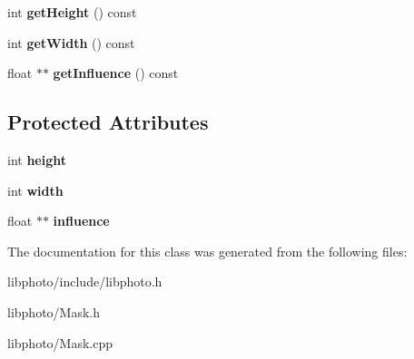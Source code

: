 \begin{DoxyCompactItemize}
\item 
\hypertarget{classMask_a38d79e2785ddb9b1684b1183963091af}{int {\bfseries get\-Height} () const }\label{classMask_a38d79e2785ddb9b1684b1183963091af}

\item 
\hypertarget{classMask_a3367b822da66a059ac6f16e79472566f}{int {\bfseries get\-Width} () const }\label{classMask_a3367b822da66a059ac6f16e79472566f}

\item 
\hypertarget{classMask_aa5e2ba0ebc60c897e19d02cc1ad7fb7e}{float $\ast$$\ast$ {\bfseries get\-Influence} () const }\label{classMask_aa5e2ba0ebc60c897e19d02cc1ad7fb7e}

\end{DoxyCompactItemize}
\subsection*{Protected Attributes}
\begin{DoxyCompactItemize}
\item 
\hypertarget{classMask_ae5fec5d187fb0fc64383badbbd5773d4}{int {\bfseries height}}\label{classMask_ae5fec5d187fb0fc64383badbbd5773d4}

\item 
\hypertarget{classMask_a3bf4b8e804ee6ba93e0e62a71062fa1e}{int {\bfseries width}}\label{classMask_a3bf4b8e804ee6ba93e0e62a71062fa1e}

\item 
\hypertarget{classMask_a424c158de57f3bbf4efa7d52f1121ab6}{float $\ast$$\ast$ {\bfseries influence}}\label{classMask_a424c158de57f3bbf4efa7d52f1121ab6}

\end{DoxyCompactItemize}


The documentation for this class was generated from the following files\-:\begin{DoxyCompactItemize}
\item 
libphoto/include/libphoto.\-h\item 
libphoto/Mask.\-h\item 
libphoto/Mask.\-cpp\end{DoxyCompactItemize}
